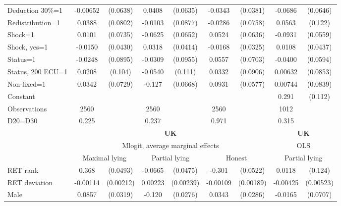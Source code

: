 \begin{tabular}{l|cccccc|cc}
Deduction 30\%=1& -0.00652         & (0.0638)&   0.0408         & (0.0635)&  -0.0343         & (0.0381)&  -0.0686         & (0.0646)\\
Redistribution=1&   0.0388         & (0.0802)&  -0.0103         & (0.0877)&  -0.0286         & (0.0758)&   0.0563         &  (0.122)\\
Shock=1         &   0.0101         & (0.0735)&  -0.0625         & (0.0652)&   0.0524         & (0.0636)&  -0.0931\sym{*}  & (0.0559)\\
Shock, yes=1    &  -0.0150         & (0.0430)&   0.0318         & (0.0414)&  -0.0168         & (0.0325)&   0.0108         & (0.0437)\\
Status=1        &  -0.0248         & (0.0895)&  -0.0309         & (0.0955)&   0.0557         & (0.0703)&  -0.0400         & (0.0594)\\
Status, 200 ECU=1&   0.0208         &  (0.104)&  -0.0540         &  (0.111)&   0.0332         & (0.0906)&  0.00632         & (0.0853)\\
Non-fixed=1     &   0.0342         & (0.0729)&   -0.127\sym{*}  & (0.0668)&   0.0931         & (0.0577)&  0.00744         & (0.0839)\\
Constant        &                  &         &                  &         &                  &         &    0.291\sym{**} &  (0.112)\\
\hline
Observations    &     2560         &         &     2560         &         &     2560         &         &     1012         &         \\
D20=D30         &    0.225         &         &    0.237         &         &    0.971         &         &    0.315         &         \\
\hline\hline
&\multicolumn{6}{c|}{\bf UK}&\multicolumn{2}{c}{\bf UK}\\ &\multicolumn{6}{c|}{Mlogit, average marginal effects }&\multicolumn{2}{c}{OLS}\\
                &\multicolumn{2}{c}{Maximal lying}&\multicolumn{2}{c}{Partial lying}&\multicolumn{2}{c}{Honest}  &\multicolumn{2}{c}{Partial lying}\\
\hline
RET rank        &    0.368\sym{***}& (0.0493)&  -0.0665         & (0.0475)&   -0.301\sym{***}& (0.0522)&   0.0118         &  (0.124)\\
RET deviation   & -0.00114         &(0.00212)&  0.00223         &(0.00239)& -0.00109         &(0.00189)& -0.00425         &(0.00523)\\
Male            &   0.0857\sym{***}& (0.0319)&   -0.120\sym{***}& (0.0276)&   0.0343         & (0.0286)&  -0.0165         & (0.0707)\\

\end{tabular}
